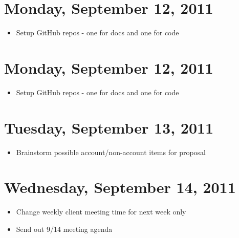 \documentclass{article}
\begin{document}
\section{Monday, September 12, 2011}
\begin{itemize}
\item Setup GitHub repos - one for docs and one for code
\end{itemize}

\section{Monday, September 12, 2011}
\begin{itemize}
\item Setup GitHub repos - one for docs and one for code
\end{itemize}

\section{Tuesday, September 13, 2011}
\begin{itemize}
\item Brainstorm possible account/non-account items for proposal
\end{itemize}

\section{Wednesday, September 14, 2011}
\begin{itemize}
\item Change weekly client meeting time for next week only
\item Send out 9/14 meeting agenda
\end{itemize}
\end{document}
